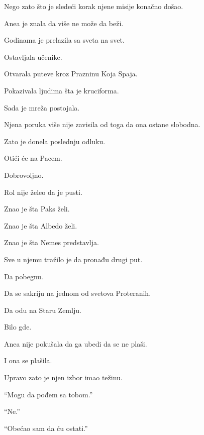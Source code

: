 Nego zato što je sledeći korak njene misije konačno došao.

\bigskip

Anea je znala da više ne može da beži.

\bigskip

Godinama je prelazila sa sveta na svet.

Ostavljala učenike.

Otvarala puteve kroz Prazninu Koja Spaja.

Pokazivala ljudima šta je kruciforma.

\bigskip

Sada je mreža postojala.

\bigskip

Njena poruka više nije zavisila od toga da ona ostane slobodna.

\bigskip

Zato je donela poslednju odluku.

\bigskip

Otići će na Pacem.

\bigskip

Dobrovoljno.

\bigskip

Rol nije želeo da je pusti.

\bigskip

Znao je šta Paks želi.

Znao je šta Albedo želi.

Znao je šta Nemes predstavlja.

\bigskip

Sve u njemu tražilo je da pronađu drugi put.

Da pobegnu.

Da se sakriju na jednom od svetova Proteranih.

Da odu na Staru Zemlju.

Bilo gde.

\bigskip

Anea nije pokušala da ga ubedi da se ne plaši.

\bigskip

I ona se plašila.

\bigskip

Upravo zato je njen izbor imao težinu.

\bigskip

``Mogu da pođem sa tobom.''

``Ne.''

\bigskip

``Obećao sam da ću ostati.''

